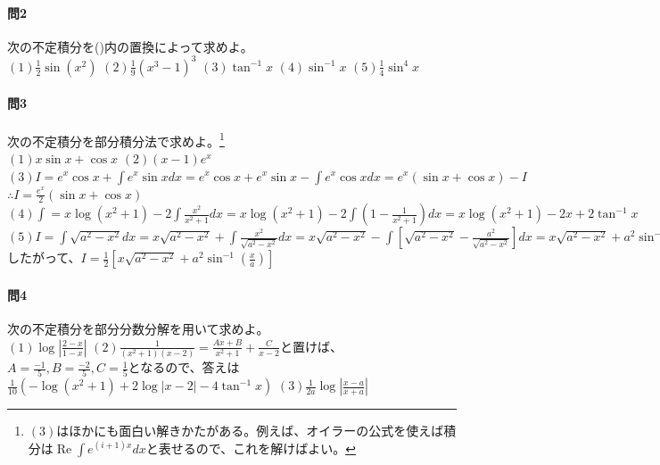 \documentclass[a4j,dvipdfmx]{jsarticle}
\renewcommand{\Re}{\operatorname{Re}}
\begin{document}
                \paragraph{問2}次の不定積分を(\hspace{1mm})内の置換によって求めよ。\\
                    $(1)\displaystyle \frac{1}{2}\sin(x^2)$\hspace{3mm}
                    $(2)\displaystyle \frac{1}{9}(x^3-1)^3$\hspace{3mm}
                    $(3)\displaystyle \tan^{-1}x$ \hspace{3mm}
                    $(4)\displaystyle \sin^{-1} x$\hspace{3mm}
                    $(5)\displaystyle \frac{1}{4}\sin^4 x$
                
                \paragraph{問3}次の不定積分を部分積分法で求めよ。\footnote{$(3)$はほかにも面白い解きかたがある。例えば、オイラーの公式を使えば積分は$\Re\int e^{(i+1)x}dx$と表せるので、これを解けばよい。}\\
                    $(1)\displaystyle x\sin x+\cos x$\hspace{3mm}
                    $(2)\displaystyle (x-1)e^x$\\
                    $(3)\displaystyle I=e^x\cos x+\int e^x\sin xdx=e^x\cos x+e^x\sin x - \int e^x\cos xdx=e^x(\sin x+\cos x)-I$\\$\therefore I=\frac{e^x}{2}(\sin x+\cos x)$\\
                    $(4)\displaystyle \int=x\log(x^2+1)-2\int \frac{x^2}{x^2+1}dx=x\log(x^2+1)-2\int\left(1-\frac{1}{x^2+1}\right)dx=x\log(x^2+1)-2x+2\tan^{-1}x$\\
                    $(5)\displaystyle I=\int \sqrt{a^2-x^2}dx=x\sqrt{a^2-x^2}+\int \frac{x^2}{\sqrt{a^2-x^2}}dx=x\sqrt{a^2-x^2}-\int\left[\sqrt{a^2-x^2}-\frac{a^2}{\sqrt{a^2-x^2}}\right]dx=x\sqrt{a^2-x^2}+a^2\sin^{-1}\left(\frac{x}{a}\right)-I$
                    したがって、$\displaystyle I=\frac{1}{2}\left[x\sqrt{a^2-x^2}+a^2\sin^{-1}\left(\frac{x}{a}\right)\right]$

                \paragraph{問4}次の不定積分を部分分数分解を用いて求めよ。\\
                    $(1)\displaystyle \log\left|\frac{2-x}{1-x}\right|$\hspace{3mm}
                    $(2)\displaystyle \frac{1}{(x^2+1)(x-2)}=\frac{Ax+B}{x^2+1}+\frac{C}{x-2}$と置けば、$A=\frac{-1}{5},B=\frac{-2}{5},C=\frac{1}{5}$となるので、答えは$\displaystyle \frac{1}{10}\left(-\log(x^2+1)+2\log|x-2|-4\tan^{-1}x\right)$\hspace{3mm}
                    $(3)\displaystyle \frac{1}{2a}\log\left|\frac{x-a}{x+a}\right|$
\end{document}
